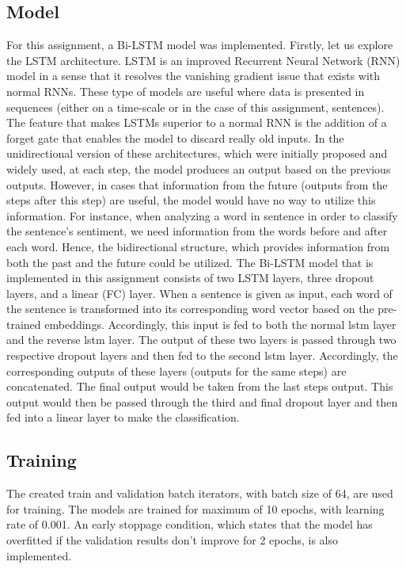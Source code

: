 \documentclass[12pt,a4paper]{article}
\begin{document}
	\subsection{Model}
	For this assignment, a Bi-LSTM model was implemented.  Firstly, let us explore the LSTM architecture. LSTM
	is an improved Recurrent Neural Network (RNN) model in a sense that it resolves the vanishing
	gradient issue that exists with normal RNNs. These type of models are useful where data is
	presented in sequences (either on a time-scale or in the case of this assignment, sentences). The
	feature that makes LSTMs superior to a normal RNN is the addition of a forget gate that enables
	the model to discard really old inputs.
	In the unidirectional version of these architectures, which were initially proposed and widely used,
	at each step, the model produces an output based on the previous outputs. However, in cases
	that information from the future (outputs from the steps after this step) are useful, the model
	would have no way to utilize this information. For instance, when analyzing a word in sentence in
	order to classify the sentence's sentiment, we need information from the words before and after
	each word. Hence, the bidirectional structure, which provides information from both the past and
	the future could be utilized.
	The Bi-LSTM model that is implemented in this assignment consists of two LSTM layers, three
	dropout layers, and a linear (FC) layer. When a sentence is given as input, each word of the
	sentence is transformed into its corresponding word vector based on the pre-trained
	embeddings. Accordingly, this input is fed to both the normal lstm layer and the reverse lstm
	layer. The output of these two layers is passed through two respective dropout layers and then
	fed to the second lstm layer. Accordingly, the corresponding outputs of these layers (outputs for
	the same steps) are concatenated. The final output would be taken from the last steps output.
	This output would then be passed through the third and final dropout layer and then fed into a
	linear layer to make the classification.

	\vspace{-0.2cm}
	\subsection{Training}
	The created train and validation batch iterators, with batch size of 64, are used for training. The models are trained for maximum of 10 epochs, with learning rate of 0.001. An early stoppage condition, which states that the model has overfitted if the validation results don't improve for 2 epochs, is also implemented.
	
\end{document}
